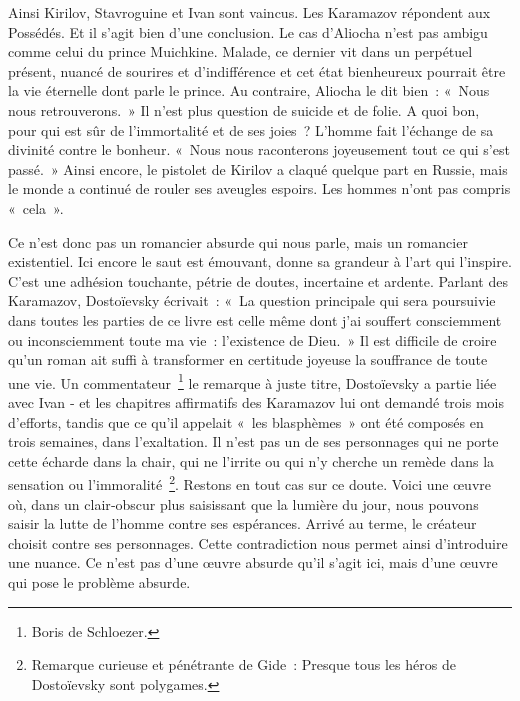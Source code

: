 \documentclass{book}
\begin{document}
Ainsi Kirilov, Stavroguine et Ivan sont vaincus. Les Karamazov répondent aux Possédés. Et il s'agit bien d'une conclusion. Le cas d'Aliocha n'est pas ambigu comme celui du prince Muichkine. Malade, ce dernier vit dans un perpétuel présent, nuancé de sourires et d'indifférence et cet état bienheureux pourrait être la vie éternelle dont parle le prince. Au contraire, Aliocha le dit bien : « Nous nous retrouverons. » Il n'est plus question de suicide et de folie. A quoi bon, pour qui est sûr de l'immortalité et de ses joies ? L'homme fait l'échange de sa divinité contre le bonheur. « Nous nous raconterons joyeusement tout ce qui s'est passé. » Ainsi encore, le pistolet de Kirilov a claqué quelque part en Russie, mais le monde a continué de rouler ses aveugles espoirs. Les hommes n'ont pas compris « cela ».

Ce n'est donc pas un romancier absurde qui nous parle, mais un romancier existentiel. Ici encore le saut est émouvant, donne sa grandeur à l'art qui l'inspire. C'est une adhésion touchante, pétrie de doutes, incertaine et ardente. Parlant des Karamazov, Dostoïevsky écrivait : « La question principale qui sera poursuivie dans toutes les parties de ce livre est celle même dont j'ai souffert consciemment ou inconsciemment toute ma vie : l'existence de Dieu. » Il est difficile de croire qu'un roman ait suffi à transformer en certitude joyeuse la souffrance de toute une vie. Un commentateur \footnote{Boris de Schloezer.} le remarque à juste titre, Dostoïevsky a partie liée avec Ivan ‑ et les chapitres affirmatifs des Karamazov lui ont demandé trois mois d'efforts, tandis que ce qu'il appelait « les blasphèmes » ont été composés en trois semaines, dans l'exaltation. Il n'est pas un de ses personnages qui ne porte cette écharde dans la chair, qui ne l'irrite ou qui n'y cherche un remède dans la sensation ou l'immoralité \footnote{Remarque curieuse et pénétrante de Gide : Presque tous les héros de Dostoïevsky sont polygames.}. Restons en tout cas sur ce doute. Voici une œuvre où, dans un clair‑obscur plus saisissant que la lumière du jour, nous pouvons saisir la lutte de l'homme contre ses espérances. Arrivé au terme, le créateur choisit contre ses personnages. Cette contradiction nous permet ainsi d'introduire une nuance. Ce n'est pas d'une œuvre absurde qu'il s'agit ici, mais d'une œuvre qui pose le problème absurde.
\end{document}
